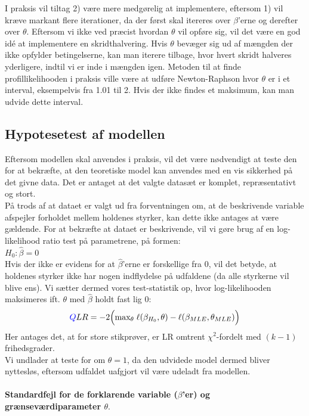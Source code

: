 \documentclass[11pt,a4paper]{article}
\begin{document}
I praksis vil tiltag 2) være mere medgørelig at implementere, eftersom 1) vil kræve markant flere iterationer, da der først skal itereres over $\beta$'erne og derefter over $\theta$. Eftersom vi ikke ved præcist hvordan $\theta$ vil opføre sig, vil det være en god idé at implementere en skridthalvering. Hvis $\theta$ bevæger sig ud af mængden der ikke opfylder betingelserne, kan man iterere tilbage, hvor hvert skridt halveres yderligere, indtil vi er inde i mængden igen. Metoden til at finde profillikelihooden i praksis ville være at udføre Newton-Raphson hvor $\theta$ er i et interval, eksempelvis fra 1.01 til 2. Hvis der ikke findes et maksimum, kan man udvide dette interval.

\subsection{Hypotesetest af modellen}
Eftersom modellen skal anvendes i praksis, vil det være nødvendigt at teste den for at bekræfte, at den teoretiske model kan anvendes med en vis sikkerhed på det givne data. Det er antaget at det valgte datasæt er komplet, repræsentativt og stort. \\
På trods af at dataet er valgt ud fra forventningen om, at de beskrivende variable afspejler forholdet mellem holdenes styrker, kan dette ikke antages at være gældende. For at bekræfte at dataet er beskrivende, vil vi gøre brug af en log-likelihood ratio test på parametrene, på formen:\\
$H_0: \hat{\beta} = 0$\\
Hvis der ikke er evidens for at $\hat{\beta}$'erne er forskellige fra 0, vil det betyde, at holdenes styrker ikke har nogen indflydelse på udfaldene (da alle styrkerne vil blive ens). Vi sætter dermed vores test-statistik op, hvor log-likelihooden maksimeres ift. $\theta$ med $\hat{\beta}$ holdt fast lig 0:\\
\begin{align*}
\textcolor{blue}{Q} LR = -2\Big{(}\text{max}_\theta \;\ell (\beta_{H_0},\theta)-\ell (\beta_{MLE},\theta_{MLE})\Big{)}
\end{align*}
Her antages det, at for store stikprøver, er LR omtrent $\chi^2$-fordelt med $(k-1)$ frihedsgrader. \\
Vi undlader at teste for om $\theta=1$, da den udvidede model dermed bliver nyttesløs, eftersom udfaldet uafgjort vil være udeladt fra modellen. \\\\
\textbf{Standardfejl for de forklarende variable ($\beta$'er) og grænseværdiparameter $\theta$}.\\
\end{document}
